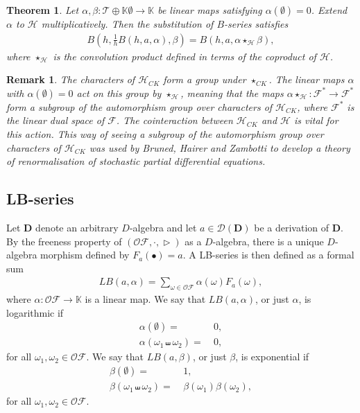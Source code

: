 \documentclass[10pt,a4paper]{article}
\newtheorem{theorem}{Theorem}[section]
\newtheorem{remark}{Remark}
\DeclareMathOperator{\graft}{\triangleright}
\begin{document}
\begin{theorem} \label{thm::Bsub}
Let $\alpha,\beta : \mathcal{T}\oplus \mathbb{K}\emptyset \to \mathbb{K}$ be linear maps satisfying $\alpha(\emptyset)=0$. Extend $\alpha$ to $\mathcal{H}$ multiplicatively. Then the substitution of $B$-series satisfies
\begin{align*}
B(h,\frac{1}{h}B(h,a,\alpha),\beta	)=B(h,a,\alpha \star_{\mathcal{H}} \beta),
\end{align*}
where $\star_{\mathcal{H}}$ is the convolution product defined in terms of the coproduct of $\mathcal{H}$.
\end{theorem}


\begin{remark}
\label{rmk:vectorfields}
The characters of $\mathcal{H}_{CK}$ form a group under $\star_{CK}$. The linear maps $\alpha$ with $\alpha(\emptyset)=0$ act on this group by $\star_{\mathcal{H}}$, meaning that the maps $\alpha \star_{\mathcal{H}} : \mathcal{F}^{\ast} \to \mathcal{F}^{\ast}$ form a subgroup of the automorphism group over characters of $\mathcal{H}_{CK}$, where $\mathcal{F}^{\ast}$ is the linear dual space of $\mathcal{F}$. The cointeraction between $\mathcal{H}_{CK}$ and $\mathcal{H}$ is vital for this action. This way of seeing a subgroup of the automorphism group over characters of $\mathcal{H}_{CK}$ was used by Bruned, Hairer and Zambotti \cite{BrunedhairerZambotti2019,BrunedhairerZambotti2020} to develop a theory of renormalisation of stochastic partial differential equations.
\end{remark}


\subsection{LB-series}
\label{ssec:LBseries}

Let $\mathbf{D}$ denote an arbitrary $D$-algebra and let $a \in \mathcal{D}(\mathbf{D})$ be a derivation of $\mathbf{D}$. By the freeness property of $(\mathcal{OF},\cdot,\graft)$ as a $D$-algebra, there is a unique $D$-algebra morphism defined by $F_a(\bullet)=a$. A LB-series is then defined as a formal sum
\begin{align*}
LB(a,\alpha)=\sum_{\omega \in \mathcal{OF}} \alpha(\omega)F_a(\omega),
\end{align*}
where $\alpha:\mathcal{OF} \to \mathbb{K}$ is a linear map. We say that $LB(a,\alpha)$, or just $\alpha$, is logarithmic if
\begin{align*}
\alpha(\emptyset)=&\ 0, \\
\alpha(\omega_1 \shuffle \omega_2)=&\ 0,
\end{align*}
for all $\omega_1, \omega_2 \in \mathcal{OF}$. We say that $LB(a,\beta)$, or just $\beta$,	 is exponential if
\begin{align*}
\beta(\emptyset)=&\ 1, \\
\beta(\omega_1 \shuffle \omega_2)=&\ \beta(\omega_1)\beta(\omega_2),
\end{align*}
for all $\omega_1,\omega_2 \in \mathcal{OF}$. \\
\end{document}
